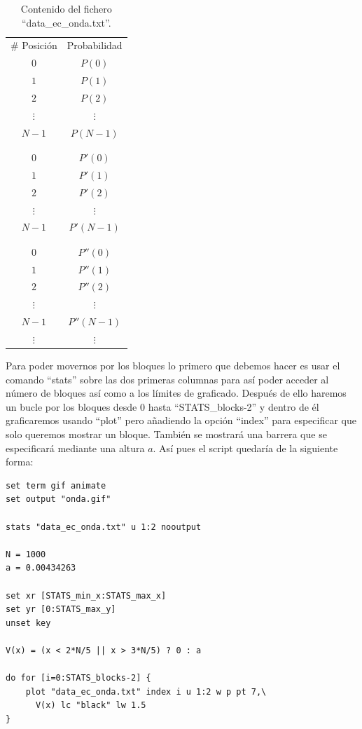 \documentclass[11pt,a4paper,twoside,pdf]{article}
\numberwithin{equation}{section}
\begin{document}
\begin{table}[htb]
	\centering
	\caption{Contenido del fichero ``data\_ec\_onda.txt''.}
	\label{tab:FicheroEcOnda}
	\vspace{10pt}
	\begin{tabular}{cc}
	\# Posición & Probabilidad \\
	$0$ & $P(0)$ \\
	$1$ & $P(1)$ \\
	$2$ & $P(2)$ \\
	$\vdots$ & $\vdots$ \\
	$N-1$ & $P(N-1)$ \\
	 & \\
	 & \\
	$0$ & $P'(0)$ \\
	$1$ & $P'(1)$ \\
	$2$ & $P'(2)$ \\
	$\vdots$ & $\vdots$ \\
	$N-1$ & $P'(N-1)$ \\
	 & \\
	 & \\
	$0$ & $P''(0)$ \\
	$1$ & $P''(1)$ \\
	$2$ & $P''(2)$ \\
	$\vdots$ & $\vdots$ \\
	$N-1$ & $P''(N-1)$ \\
	$\vdots$ & $\vdots$ \\
	\end{tabular}
\end{table}

Para poder movernos por los bloques lo primero que debemos hacer es usar el comando ``stats'' sobre las dos primeras columnas para así poder acceder al número de bloques así como a los límites de graficado. Después de ello haremos un bucle por los bloques desde $0$ hasta ``STATS\_blocks-2'' y dentro de él graficaremos usando ``plot'' pero añadiendo la opción ``index'' para especificar que solo queremos mostrar un bloque. También se mostrará una barrera que se especificará mediante una altura $a$. Así pues el script quedaría de la siguiente forma:

\newpage

\begin{lstlisting}[language=Gnuplot]
set term gif animate
set output "onda.gif"

stats "data_ec_onda.txt" u 1:2 nooutput

N = 1000
a = 0.00434263

set xr [STATS_min_x:STATS_max_x]
set yr [0:STATS_max_y]
unset key

V(x) = (x < 2*N/5 || x > 3*N/5) ? 0 : a

do for [i=0:STATS_blocks-2] {
	plot "data_ec_onda.txt" index i u 1:2 w p pt 7,\
	  V(x) lc "black" lw 1.5
}

\end{lstlisting}
\end{document}
